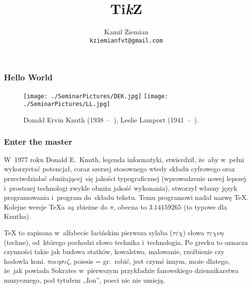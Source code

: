 \documentclass[10pt]{beamer}  %
\title{Ti\emph{k}Z}
\author{Kamil Ziemian \\
  \texttt{kziemianfvt@gmail.com}}
\begin{document}



\maketitle %



\begin{frame}
  \frametitle{Hello World}

  \begin{figure}

    \texttt{[image: ./SeminarPictures/DEK.jpg]}
    \texttt{[image: ./SeminarPictures/LL.jpg]}

    \caption{Donald Ervin Knuth (1938~--~), Leslie Lamport (1941~--~).}

  \end{figure}

\end{frame}





\begin{frame}
  \frametitle{Enter the master}


  W~1977 roku Donald E.~Knuth, legenda informatyki, stwierdził, że~aby
  w~pełni wykorzystać potencjał, coraz szerzej stosownego wtedy składu
  cyfrowego oraz przeciwdziałać obniżającej~się jakości typograficznej
  (wprowadzenie nowej lepszej i~prostszej technologi zwykle obniża
  jakość wykonania), stworzył własny język programowania i~program
  do~składu tekstu. Temu programowi nadał nazwę \TeX. Kolejne wersje
  \TeX a~są zbieżne do $\pi$, obecna to $3.14159265$ (to typowe dla
  Knutha).

  \TeX{} to zapisana w~alfabecie łacińskim pierwsza sylaba
  ($\tau\varepsilon\chi$) słowa $\tau\varepsilon\chi\nu\eta$ (techne), od~którego pochodzi słowo technika
  i~technologia. Po grecku to oznacza czynności takie jak budowa
  statków, kowalstwo, malowanie, rzeźbienie czy hodowla koni.
  $\pi o\iota\eta\sigma\iota\zeta$, poiesis = gr.~robić, jest czymś innym, może dlatego,
  że~jak powiada Sokrates w~pierwszym przykładzie fanowskiego
  dziennikarstwa muzycznego, pod tytułem ,,Ion'', poeci nic nie
  umieją.

\end{frame}
\end{document}
